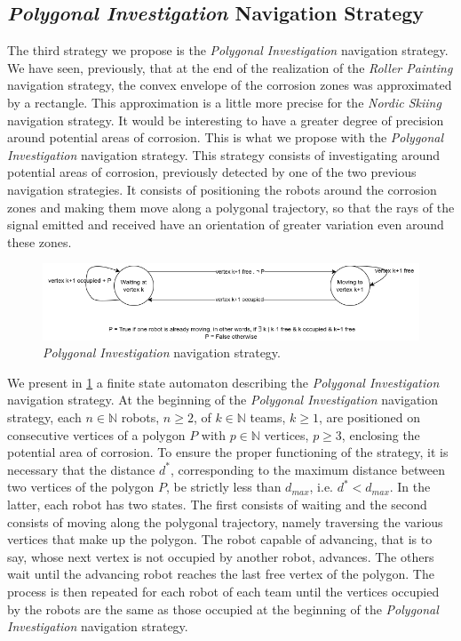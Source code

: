 \subsection{\textit{Polygonal Investigation} Navigation Strategy}

The third strategy we propose is the \textit{Polygonal Investigation} navigation strategy.
We have seen, previously, that at the end of the realization of the \textit{Roller Painting} navigation strategy, the convex envelope of the corrosion zones was approximated by a rectangle.
This approximation is a little more precise for the \textit{Nordic Skiing} navigation strategy.
It would be interesting to have a greater degree of precision around potential areas of corrosion.
This is what we propose with the \textit{Polygonal Investigation} navigation strategy.
This strategy consists of investigating around potential areas of corrosion, previously detected by one of the two previous navigation strategies.
It consists of positioning the robots around the corrosion zones and making them move along a polygonal trajectory, so that the rays of the signal emitted and received have an orientation of greater variation even around these zones.

\begin{figure}[h!]
	\centering
	\includegraphics[scale=0.6]{graphics/automat_poly.png}
	\caption{\textit{Polygonal Investigation} navigation strategy.}
	\label{fig:automat}
\end{figure}

We present in \ref{fig:automat} a finite state automaton describing the \textit{Polygonal Investigation} navigation strategy.
At the beginning of the \textit{Polygonal Investigation} navigation strategy, each $n \in \mathbb{N}$ robots, $n \ge 2$, of $k \in \mathbb{N}$ teams, $k \ge 1$, are positioned on consecutive vertices of a polygon $P$ with $p \in \mathbb{N}$ vertices, $p \ge 3$, enclosing the potential area of corrosion.
To ensure the proper functioning of the strategy, it is necessary that the distance $d^*$, corresponding to the maximum distance between two vertices of the polygon $P$, be strictly less than $d_{max}$, i.e. $d^* < d_{max}$.
In the latter, each robot has two states.
The first consists of waiting and the second consists of moving along the polygonal trajectory, namely traversing the various vertices that make up the polygon.
The robot capable of advancing, that is to say, whose next vertex is not occupied by another robot, advances.
The others wait until the advancing robot reaches the last free vertex of the polygon.
The process is then repeated for each robot of each team until the vertices occupied by the robots are the same as those occupied at the beginning of the \textit{Polygonal Investigation} navigation strategy.

